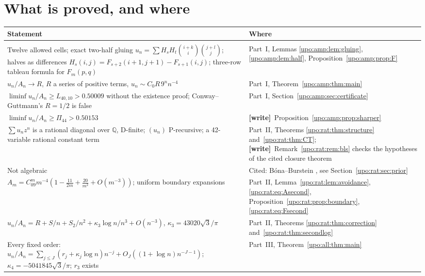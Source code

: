 \documentclass[11pt,letterpaper]{article}
\theoremstyle{remark}\newtheorem{remark}[theorem]{Remark}
\numberwithin{equation}{section}
\newcommand{\Av}{\operatorname{Av}}
\newcommand{\wtag}{\textup{\textbf{[write]}}}
\begin{document}
\section*{What is proved, and where}\label{upo:sec:status}
\begingroup\small
\begin{longtable}{@{}>{\raggedright\arraybackslash}p{} >{\raggedright\arraybackslash}p{}@{}}
\toprule
Statement & Where\\
\midrule
\endhead
\multicolumn{2}{@{}l}{\emph{One $1234$ (A217057); $A_n=|\Av_n(1234)|$, $C_0=81\sqrt3/(16\pi)$}}\\
Twelve allowed cells; exact two-half gluing $u_n=\sum H_sH_t\binom{i+k}i\binom{j+l}j$; halves as differences $H_s(i,j)=F_{s+2}(i+1,j+1)-F_{s+1}(i,j)$; three-row tableau formula for $F_m(p,q)$ & Part~I, Lemmas \ref{upo:amp:lem:gluing}, \ref{upo:amp:lem:half}, Proposition~\ref{upo:amp:prop:F}\\
$u_n/A_n\to R$, $R$ a series of positive terms, $u_n\sim C_0R\,9^nn^{-4}$ & Part~I, Theorem~\ref{upo:amp:thm:main}\\
$\liminf u_n/A_n\ge L_{40,10}>0.50009$ without the existence proof; Conway--Guttmann's $R=1/2$ is false & Part~I, Section~\ref{upo:amp:sec:certificate}\\
$\liminf u_n/A_n\ge\Pi_{44}>0.50153$ & \wtag\ Proposition~\ref{upo:amp:prop:sharper}\\
$\sum u_nz^n$ is a rational diagonal over $\mathbb Q$, D-finite; $(u_n)$ P-recursive; a 42-variable rational constant term & Part~II, Theorems \ref{upo:rat:thm:structure} and~\ref{upo:rat:thm:CT}; \wtag\ Remark~\ref{upo:rat:rem:bls} checks the hypotheses of the cited closure theorem\\
Not algebraic & Cited: B\'ona--Burstein \cite[Theorem 6.2]{BB}, see Section~\ref{upo:rat:sec:prior}\\
$A_m=C_09^mm^{-4}(1-\frac{11}{2m}+\frac{20}{m^2}+O(m^{-3}))$; uniform boundary expansions & Part~II, Lemma~\ref{upo:rat:lem:avoidance}, \eqref{upo:rat:eq:Asecond}, Proposition~\ref{upo:rat:prop:boundary}, \eqref{upo:rat:eq:Fsecond}\\
$u_n/A_n=R+S/n+S_2/n^2+\kappa_3\log n/n^3+O(n^{-3})$, $\kappa_3=43020\sqrt3/\pi$ & Part~II, Theorems \ref{upo:rat:thm:correction} and~\ref{upo:rat:thm:secondlog}\\
Every fixed order: $u_n/A_n=\sum_{j\le J}(r_j+\kappa_j\log n)n^{-j}+O_J((1+\log n)n^{-J-1})$; $\kappa_4=-5041845\sqrt3/\pi$; $r_3$ exists & Part~III, Theorem~\ref{upo:all:thm:main}\\

\end{longtable}
\end{document}
